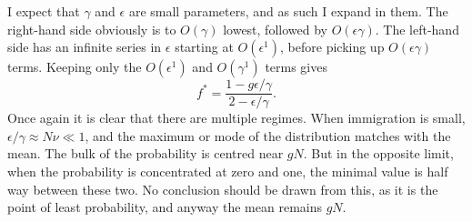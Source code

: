 I expect that $\gamma$ and $\epsilon$ are small parameters, and as such I expand in them. 
The right-hand side obviously is to $O(\gamma)$ lowest, followed by $O(\epsilon\gamma)$. 
The left-hand side has an infinite series in $\epsilon$ starting at $O(\epsilon^1)$, before picking up $O(\epsilon\gamma)$ terms. 
Keeping only the $O(\epsilon^1)$ and $O(\gamma^1)$ terms gives
\begin{equation}
	f^* = \frac{1-g\epsilon/\gamma}{2-\epsilon/\gamma}. %
\end{equation}
Once again it is clear that there are multiple regimes. 
When immigration is small, $\epsilon/\gamma \approx N\nu \ll 1$, and the maximum or mode of the distribution matches with the mean. 
The bulk of the probability is centred near $g N$. 
But in the opposite limit, when the probability is concentrated at zero and one, the minimal value is half way between these two. 
No conclusion should be drawn from this, as it is the point of least probability, and anyway the mean remains $gN$. 

